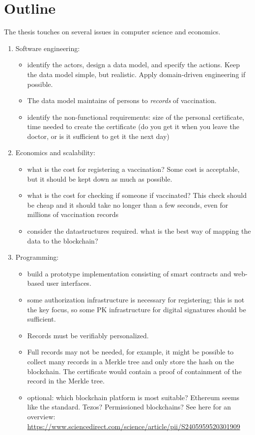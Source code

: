 \documentclass{article}
\begin{document}
\section{Outline}
\label{sec:outline}

The thesis touches on several issues in computer science and economics.

\begin{enumerate}
\item Software engineering:
  \begin{itemize}
  \item identify the actors, design a data model, and specify the
    actions. Keep the data model simple, but realistic. Apply
    domain-driven engineering if possible.
  \item The data model maintains of persons to \emph{records} of vaccination.
  \item identify the non-functional requirements: size of the personal
    certificate, time needed to create the certificate (do you get it
    when you leave the doctor, or is it sufficient to get it the next day)
  \end{itemize}

\item Economics and scalability:
  \begin{itemize}
  \item what is the cost for registering a vaccination? Some cost is
    acceptable, but it should be kept down as much as possible.
  \item what is the cost for checking if someone if vaccinated? This
    check should be cheap and it should take no longer than a few
    seconds, even for millions of vaccination records
  \item consider the datastructures required. what is the best way of
    mapping the data to the blockchain?
  \end{itemize}
\item Programming:
  \begin{itemize}
  \item build a prototype implementation consisting of smart contracts
    and web-based user interfaces.
  \item some authorization infrastructure is necessary for
    registering; this is not the key focus, so some PK infrastructure
    for digital signatures should be sufficient.
  \item Records must be verifiably personalized.
  \item  Full records may not be needed, for example, it might be
    possible to collect many records in a Merkle tree and only store
    the hash on the blockchain. The certificate would contain a proof
    of containment of the record in the Merkle tree.
  \item optional: which blockchain platform is most suitable? Ethereum
    seems like the standard. Tezos? Permissioned blockchains? See here
    for an overview: \url{https://www.sciencedirect.com/science/article/pii/S2405959520301909}
  \end{itemize}
\end{enumerate}
\end{document}
